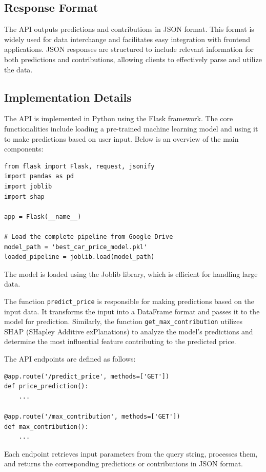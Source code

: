 \documentclass[a4paper,12pt]{article}
\begin{document}
\begin{justify}
\subsection{Response Format}
The API outputs predictions and contributions in JSON format. This format is widely used for data interchange and facilitates easy integration with frontend applications. JSON responses are structured to include relevant information for both predictions and contributions, allowing clients to effectively parse and utilize the data.

\subsection{Implementation Details}
The API is implemented in Python using the Flask framework. The core functionalities include loading a pre-trained machine learning model and using it to make predictions based on user input. Below is an overview of the main components:

\begin{verbatim}
from flask import Flask, request, jsonify
import pandas as pd
import joblib
import shap

app = Flask(__name__)

# Load the complete pipeline from Google Drive
model_path = 'best_car_price_model.pkl'
loaded_pipeline = joblib.load(model_path)
\end{verbatim}

The model is loaded using the Joblib library, which is efficient for handling large data. 

The function \texttt{predict\_price} is responsible for making predictions based on the input data. It transforms the input into a DataFrame format and passes it to the model for prediction. Similarly, the function \texttt{get\_max\_contribution} utilizes SHAP (SHapley Additive exPlanations) to analyze the model's predictions and determine the most influential feature contributing to the predicted price.

The API endpoints are defined as follows:

\begin{verbatim}
@app.route('/predict_price', methods=['GET'])
def price_prediction():
    ...
    
@app.route('/max_contribution', methods=['GET'])
def max_contribution():
    ...
\end{verbatim}

Each endpoint retrieves input parameters from the query string, processes them, and returns the corresponding predictions or contributions in JSON format.


\end{justify}
\end{document}
